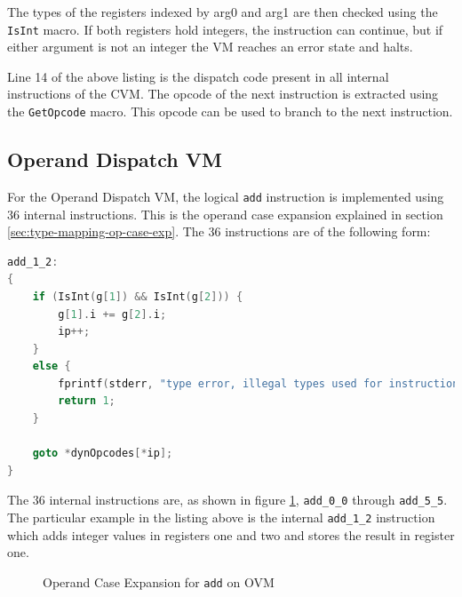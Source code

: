 \documentclass[english,a4paper,12pt]{report}
\begin{document}
The types of the registers indexed by arg0 and arg1 are then checked
using the \verb|IsInt| macro. If both registers hold integers, the
instruction can continue, but if either argument is not an integer the
VM reaches an error state and halts.

Line 14 of the above listing is the dispatch code present in all
internal instructions of the CVM. The opcode of the next instruction
is extracted using the \verb|GetOpcode| macro. This opcode can be used to
branch to the next instruction. 

\subsection{Operand Dispatch VM}
\label{sec:operand-dispatch-implementation}

For the Operand Dispatch VM, the logical \verb|add| instruction is
implemented using 36 internal instructions. This is the operand case
expansion explained in section \ref{sec:type-mapping-op-case-exp}. The
36 instructions are of the following form:

\begin{lstlisting}[language=C]
add_1_2:
{
    if (IsInt(g[1]) && IsInt(g[2])) {
        g[1].i += g[2].i;
        ip++;
    }
    else {
        fprintf(stderr, "type error, illegal types used for instruction: add");
        return 1;
    }

    goto *dynOpcodes[*ip];
}
\end{lstlisting}

The 36 internal instructions are, as shown in figure
\ref{fig:op-case-expansion-implementation}, \verb|add_0_0| through
\verb|add_5_5|. The particular example in the listing above is the
internal \verb|add_1_2| instruction which adds integer values in
registers one and two and stores the result in register one. 

\begin{figure}[!htb]
	\centering
	\caption{Operand Case Expansion for \texttt{add} on OVM}
	\label{fig:op-case-expansion-implementation}	
\end{figure}
\end{document}
